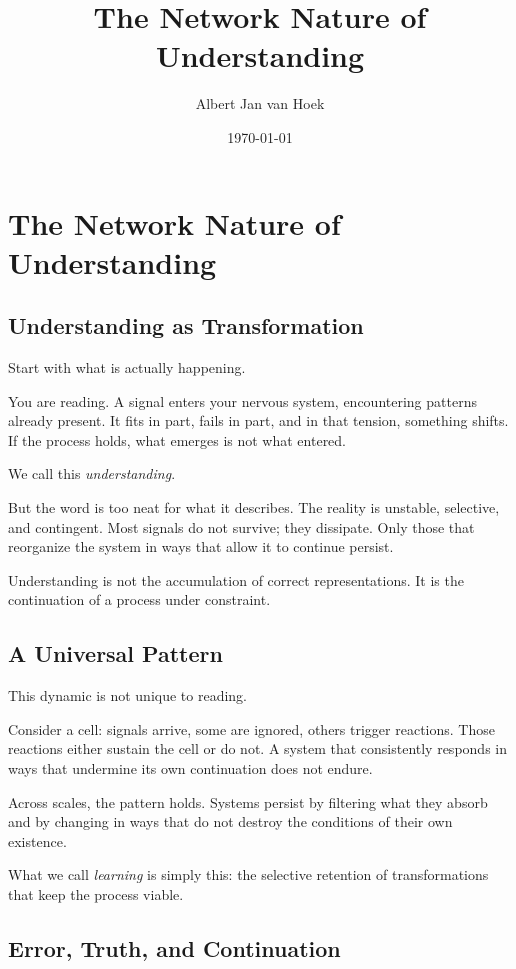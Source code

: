\documentclass{article}
\title{The Network Nature of Understanding}
\author{Albert Jan van Hoek}
\date{\today}
\begin{document}
\maketitle

\section*{The Network Nature of Understanding}

\subsection*{Understanding as Transformation}

Start with what is actually happening.

You are reading. A signal enters your nervous system, encountering patterns already present. It fits in part, fails in part, and in that tension, something shifts. If the process holds, what emerges is not what entered.

We call this \textit{understanding}.

But the word is too neat for what it describes. The reality is unstable, selective, and contingent. Most signals do not survive; they dissipate. Only those that reorganize the system in ways that allow it to continue persist.

Understanding is not the accumulation of correct representations. It is the continuation of a process under constraint.

\subsection*{A Universal Pattern}

This dynamic is not unique to reading.

Consider a cell: signals arrive, some are ignored, others trigger reactions. Those reactions either sustain the cell or do not. A system that consistently responds in ways that undermine its own continuation does not endure.

Across scales, the pattern holds. Systems persist by filtering what they absorb and by changing in ways that do not destroy the conditions of their own existence.

What we call \textit{learning} is simply this: the selective retention of transformations that keep the process viable.

\subsection*{Error, Truth, and Continuation}
\end{document}
